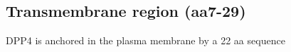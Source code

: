 \subsection{Transmembrane region (aa7-29)}

DPP4 is anchored in the plasma membrane by a 22 aa sequence